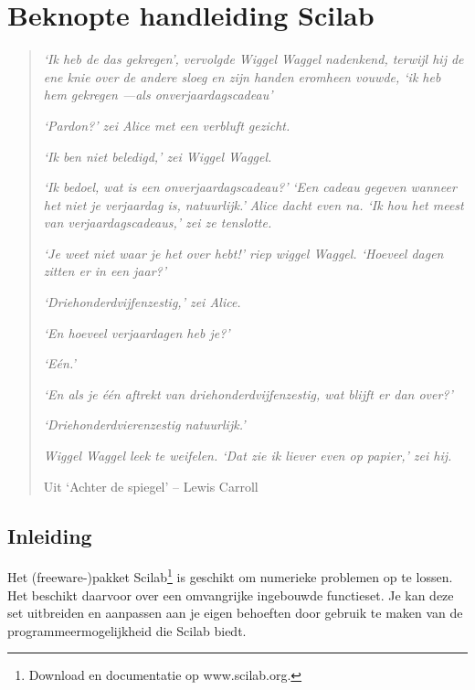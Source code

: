 
\chapter{Beknopte handleiding Scilab}
\label{scilab}
\begin{quote}
     \textit{{\small `Ik heb de das gekregen', vervolgde Wiggel 
Waggel nadenkend, terwijl hij de ene knie over de andere sloeg en 
zijn handen eromheen vouwde, `ik heb hem gekregen ---als 
onverjaardagscadeau'}}

     \textit{{\small `Pardon?' zei Alice met een verbluft gezicht.}}

     \textit{{\small `Ik ben niet beledigd,' zei Wiggel Waggel.}}

     \textit{{\small `Ik bedoel, wat is een onverjaardagscadeau?'}}
     \textit{{\small `Een cadeau gegeven wanneer het niet je verjaardag is, natuurlijk.'}}
	\textit{{\small Alice dacht even na. `Ik hou het meest van verjaardagscadeaus,' zei ze tenslotte.}}
	
	
\textit{{\small `Je weet niet waar je het over hebt!' riep wiggel 
Waggel. `Hoeveel dagen zitten er in een jaar?'}}
	
	\textit{{\small 
`Driehonderdvijfenzestig,' zei Alice.}}
			
	\textit{{\small `En 
hoeveel verjaardagen heb je?'}}
	
	\textit{{\small `E\'{e}n.'}}
	
	
\textit{{\small `En als je \'{e}\'{e}n aftrekt van 
driehonderdvijfenzestig, wat blijft er dan over?'}}
	
	
\textit{{\small `Driehonderdvierenzestig natuurlijk.'}}
	
		
\textit{{\small Wiggel Waggel leek te weifelen. `Dat zie ik liever 
even op papier,' zei hij.}}
		
          Uit `Achter de spiegel' -- Lewis Carroll
\end{quote}

\newpage

\section{Inleiding}

Het (freeware-)pakket Scilab\footnote{Download en documentatie op www.scilab.org.} is geschikt om numerieke problemen op te lossen. Het beschikt daarvoor over een omvangrijke ingebouwde functieset. Je kan deze set uitbreiden en aanpassen aan je eigen behoeften door gebruik te maken van de programmeermogelijkheid die Scilab biedt.

